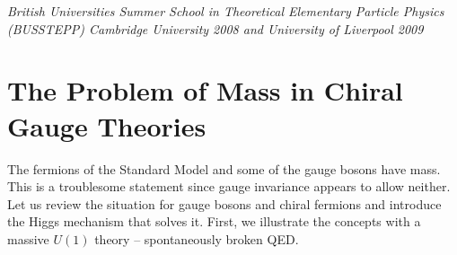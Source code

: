 \documentclass[12pt]{article}
\def\xsection#1{\section{#1}}
\begin{document}
\begin{titlepage}
\begin{abstract}
These lectures focus on the structure of various Higgs boson theories. Topics in the first lectures include: mass generation in chiral theories, spontaneous symmetry breaking, neutrino masses, perturbative unitarity, vacuum stability, vacuum alignment,  flavor changing neutral current solutions with multiple Higgs doublets, analysis of type I theory with $Z_2$ symmetry, and rephasing symmetries. After an  Essay on the Hierarchy Problem, additional topics are covered that more directly relate to naturalness of the electroweak theory. Emphasis is on their connection to Higgs boson physics. Topics in these later lectures include: supersymmetry, supersymmetric Higgs sector in the Runge basis, leading-order radiative corrections of supersymmetric light Higgs boson mass, theories of extra dimensions, and radion mixing with the Higgs boson in warped extra dimensions. And finally, one lecture is devoted to Higgs boson connections to the hidden sector.


\end{abstract}

\vspace{1cm}

\begin{center}
{\it British Universities Summer School in Theoretical Elementary Particle Physics  \\
(BUSSTEPP) Cambridge University 2008 and University of Liverpool 2009 }
\end{center}


\end{titlepage}

\setcounter{page}{2}



\tableofcontents

\vfill\eject


\xsection{The Problem of Mass in Chiral Gauge Theories}

The fermions of the Standard Model and some of the gauge bosons have mass. This is a troublesome statement since gauge invariance appears to allow neither. Let us review the situation for gauge bosons and chiral fermions and introduce the Higgs mechanism that solves it. First, we illustrate the concepts with a massive $U(1)$ theory -- spontaneously broken QED.
\end{document}
